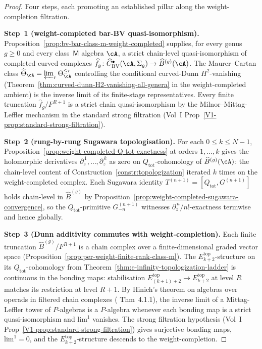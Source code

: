 \begin{proof}
Four steps, each promoting an established pillar along the
weight-completion filtration.

\smallskip\noindent
\textbf{Step~1 (weight-completed bar-BV quasi-isomorphism).}
Proposition~\ref{prop:bv-bar-class-m-weight-completed} supplies, for
every genus $g \ge 0$ and every class~$\mathsf{M}$ algebra $\cA$, a
strict chain-level quasi-isomorphism of completed curved complexes
$\widehat{f}_g \colon \widehat{C}^{\bullet}_{\mathrm{BV}}(\cA, \Sigma_g)
\to \widehat{B}^{(g)}(\cA)$. The Maurer--Cartan class
$\widehat{\Theta}_\cA = \varprojlim_r \Theta_\cA^{\le r}$ controlling
the conditional curved-Dunn \(H^2\)-vanishing
(Theorem~\ref{thm:curved-dunn-H2-vanishing-all-genera} in the
weight-completed ambient) is the inverse limit of its finite-stage
representatives. Every finite truncation
$\widehat{f}_g / F^{R + 1}$ is a strict chain quasi-isomorphism by
the Milnor--Mittag-Leffler mechanism in the standard strong filtration
(Vol~I Prop~\ref{V1-prop:standard-strong-filtration}).

\smallskip\noindent
\textbf{Step~2 (rung-by-rung Sugawara topologisation).}
For each $0 \le k \le N - 1$,
Proposition~\ref{prop:weight-completed-Q-tot-exactness} at orders
$1, \ldots, k$ gives the holomorphic derivatives
$\partial_z^{\,1}, \ldots, \partial_z^{\,k}$ as zero on
$Q_{\mathrm{tot}}$-cohomology of $\widehat{B}^{(g)}(\cA)$: the
chain-level content of Construction~\ref{constr:topologization}
iterated $k$ times on the weight-completed complex. Each Sugawara
identity $T^{(n+1)} = [Q_{\mathrm{tot}}, G^{(n+1)}]$ holds
chain-level in $\widehat{B}^{(g)}$ by
Proposition~\ref{prop:weight-completed-sugawara-convergence}, so the
$Q_{\mathrm{tot}}$-primitive $G^{(n+1)}_{-n}$ witnesses
$\partial_z^{\,n}/n!$-exactness termwise and hence globally.

\smallskip\noindent
\textbf{Step~3 (Dunn additivity commutes with weight-completion).}
Each finite truncation $\widehat{B}^{(g)} / F^{R + 1}$ is a chain
complex over a finite-dimensional graded vector space
(Proposition~\ref{prop:per-weight-finite-rank-class-m}). The
$E_{k+2}^{\mathrm{top}}$-structure on its $Q_{\mathrm{tot}}$-cohomology
from Theorem~\ref{thm:e-infinity-topologization-ladder} is continuous
in the bonding maps: stabilisation $E_{(k+1)+2}^{\mathrm{top}} \to
E_{k+2}^{\mathrm{top}}$ at level $R$ matches its restriction at level
$R + 1$. By Hinich's theorem on algebras over operads in filtered
chain complexes (\cite{Hin15} Thm~4.1.1), the inverse limit of a
Mittag-Leffler tower of $P$-algebras is a $P$-algebra whenever each
bonding map is a strict quasi-isomorphism and $\mathrm{lim}^1$
vanishes. The strong filtration hypothesis (Vol~I
Prop~\ref{V1-prop:standard-strong-filtration}) gives surjective
bonding maps, $\mathrm{lim}^1 = 0$, and the
$E_{k+2}^{\mathrm{top}}$-structure descends to the weight-completion.


\end{proof}
